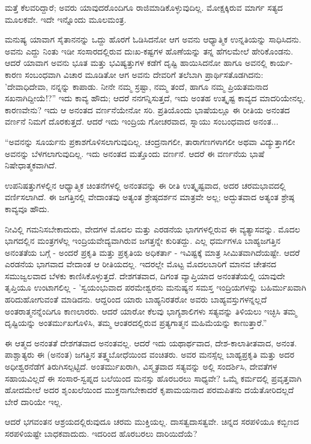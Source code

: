 ಮತ್ತೆ ಕೆಲವರಿದ್ದಾರೆ; ಅವರು ಯಾವುದರೊಂದಿಗೂ ರಾಜಿಮಾಡಿಕೊಳ್ಳುವುದಿಲ್ಲ. ಮೋಕ್ಷಕ್ಕಿರುವ ಮಾರ್ಗ ಸತ್ಯದ ಮೂಲಕವೇ. ಇದೇ ಇನ್ನೊಂದು ಮೂಲಮಂತ್ರ.

ಮನುಷ್ಯ ಯಾವಾಗ ಸೈತಾನನನ್ನು ಒದ್ದು ಹೊರಗೆ ಓಡಿಸಿದನೋ ಆಗ ಅವನು ಆಧ್ಯಾತ್ಮಿಕ ಉನ್ನತಿಯನ್ನು ಸಾಧಿಸಿದನು. ಅವನು ಎದ್ದು ನಿಂತು ಇಡೀ ಸಂಸಾರದಲ್ಲಿರುವ ದುಃಖ-ಕಷ್ಟಗಳ ಹೊಣೆಯನ್ನು ತನ್ನ ಹೆಗಲಮೇಲೆ ಹೇರಿಕೊಂಡನು. ಆದರೆ ಯಾವಾಗ ಅವನು ಭೂತ ಮತ್ತು ಭವಿಷ್ಯತ್ತುಗಳ ಕಡೆಗೆ ದೃಷ್ಟಿ ಹಾಯಿಸಿದನೋ ಹಾಗೂ ಅವನಲ್ಲಿ ಕಾರ್ಯ-ಕಾರಣ ಸಂಬಂಧವಾಗಿ ವಿಚಾರ ಮೂಡಿತೋ ಆಗ ಅವನು ದೇವರಿಗೆ ತಲೆಬಾಗಿ ಪ್ರಾರ್ಥಿಸತೊಡಗಿದನು: 'ದೇವಾಧಿದೇವಾ, ನನ್ನನ್ನು ಕಾಪಾಡು. ನೀನೇ ನಮ್ಮ ಸ್ರಷ್ಟಾ, ನಮ್ಮ ತಂದೆ, ಹಾಗೂ ನಮ್ಮ ಪ್ರಿಯತಮನಾದ ಸಖನಾಗಿದ್ದೀಯೆ!?” ಇದು ಕಾವ್ಯ ಹೌದು; ಆದರೆ ನನಗನ್ನಿಸುತ್ತದೆ, ಇದು ಅಂತಹ ಉತ್ಕೃಷ್ಟ ಕಾವ್ಯದ ಮಾದರಿಯೇನಲ್ಲ. ಕಾರಣವೇನು? ಇದು ಆ ಅನಂತದ ವರ್ಣನೆಯೇನೋ ಸರಿ. ಪ್ರತಿಯೊಂದು ಭಾಷೆಯಲ್ಲೂ ಈ ರೀತಿಯ ಅನಂತದ ವರ್ಣನೆ ನಿಮಗೆ ದೊರಕುತ್ತದೆ. ಆದರೆ ಇದು ಇಂದ್ರಿಯ ಗೋಚರವಾದ, ಸ್ನಾಯು ಸಂಬಂಧವಾದ ಅನಂತ...

“ಅವನನ್ನು ಸೂರ್ಯನು ಪ್ರಕಾಶಗೊಳಿಸಲಾಗುವುದಿಲ್ಲ. ಚಂದ್ರನಾಗಲೀ, ತಾರಾಗಣಗಳಾಗಲೀ ಅಥವಾ ವಿದ್ಯುತ್ತಾಗಲೀ ಅವನನ್ನು ಬೆಳಗಲಾಗುವುದಿಲ್ಲ. ಇದು ಅನಂತದ ಮತ್ತೊಂದು ವರ್ಣನೆ. ಆದರೆ ಈ ವರ್ಣನೆಯ ಭಾಷೆ ನಿಷೇಧಾತ್ಮಕವಾಗಿದೆ.

ಉಪನಿಷತ್ತುಗಳಲ್ಲಿನ ಆಧ್ಯಾತ್ಮಿಕ ಚಿಂತನೆಗಳಲ್ಲಿ ಅನಂತವನ್ನು ಈ ರೀತಿ ಉತ್ಕೃಷ್ಟವಾದ, ಅದರ ಚರಮಭಾವದಲ್ಲಿ ವರ್ಣಿಸಲಾಗಿದೆ. ಈ ಜಗತ್ತಿನಲ್ಲಿ ವೇದಾಂತವು ಅತ್ಯಂತ ಶ್ರೇಷ್ಠದರ್ಶನ ಮಾತ್ರವೇ ಅಲ್ಲ; ಅದ್ಭುತವಾದ ಅತ್ಯಂತ ಶ್ರೇಷ್ಠ ಕಾವ್ಯವೂ ಹೌದು.

ನೀವಿಲ್ಲಿ ಗಮನಿಸಬೇಕಾದುದು, ವೇದಗಳ ಮೊದಲ ಮತ್ತು ಎರಡನೆಯ ಭಾಗಗಳಲ್ಲಿರುವ ಈ ವ್ಯತ್ಯಾಸವನ್ನು. ಮೊದಲ ಭಾಗದಲ್ಲಿನ ಮಂತ್ರಗಳೆಲ್ಲ ಇಂದ್ರಿಯವೇದ್ಯವಾಗಿರುವ ಜಗತ್ತನ್ನೇ ಕುರಿತದ್ದು. ಎಲ್ಲ ಧರ್ಮಗಳೂ ಬಾಹ್ಯಜಗತ್ತಿನ ಅನಂತತೆಯ ಬಗ್ಗೆ - ಅಂದರೆ ಪ್ರಕೃತಿ ಮತ್ತು ಪ್ರಕೃತಿಯ ಅಧಿಕರ್ತಾ - ಇವಿಷ್ಟಕ್ಕೆ ಮಾತ್ರ ಸೀಮಿತವಾಗಿದೆಯಷ್ಟೇ. ಆದರೆ ಎರಡನೆಯ ಭಾಗವಾದ ವೇದಾಂತ ಆ ರೀತಿಯದಲ್ಲ. ಇದರಲ್ಲೇ ಮೊಟ್ಟ ಮೊದಲಬಾರಿಗೆ ಮಾನವ ಚೇತನದ ಸಮುಜ್ವಲವಾದ ಬೆಳಕು ಕಾಣಿಸಿಕೊಳ್ಳುತ್ತದೆ. ದೇಶಗತವಾದ, ದಿಗಂತ ವ್ಯಾಪ್ತಿಯಾದ ಅನಂತತೆಯಲ್ಲಿ ಯಾವುದೇ ತೃಪ್ತಿಯೂ ಉಂಟಾಗಲಿಲ್ಲ - 'ಸ್ವಯಂಭುವಾದ ಪರಮೇಶ್ವರನು ಮನುಷ್ಯನ ಸಮಸ್ತ ಇಂದ್ರಿಯಗಳನ್ನು ಬಹಿರ್ಮುಖವಾಗಿ ಹರಿದುಹೋಗುವಂತೆ ಮಾಡಿದನು. ಆದ್ದರಿಂದ ಯಾರು ಬಾಹ್ಯನಿರತರೋ ಅವರು ಬಾಹ್ಯವಸ್ತುಗಳನ್ನಲ್ಲದೆ ಅಂತರಾತ್ಮನನ್ನೆಂದಿಗೂ ಕಾಣಲಾರರು. ಆದರೆ ಯಾರೋ ಕೆಲವು ಭಾಗ್ಯಶಾಲಿಗಳು ಸತ್ಯವನ್ನು ತಿಳಿಯಲು ಇಚ್ಛಿಸಿ ತಮ್ಮ ದೃಷ್ಟಿಯನ್ನು ಅಂತರ್ಮುಖಗೊಳಿಸಿ, ತಮ್ಮ ಆಂತರದಲ್ಲಿರುವ ಪ್ರತ್ಯಗಾತ್ಮನ ಮಹಿಮೆಯನ್ನು ಕಾಣುತ್ತಾರೆ.”

ಈ ಆತ್ಮದ ಅನಂತತೆ ದೇಶಗತವಾದ ಅನಂತವಲ್ಲ. ಆದರೆ ಇದು ಯಥಾರ್ಥವಾದ, ದೇಶ-ಕಾಲಾತೀತವಾದ, ಅನಂತ. ಪಾಶ್ಚಾತ್ಯರು ಈ (ಅನಂತ) ಜಗತ್ತಿನ ತತ್ತ್ವಬೋಧೆಯಿಂದ ವಂಚಿತರು. ಅವರ ಮನಸ್ಸೆಲ್ಲ ಬಾಹ್ಯಪ್ರಕೃತಿ ಮತ್ತು ಅದರ ಅಧೀಶ್ವರನೆಡೆಗೆ ತಿರುಗಿಸಲ್ಪಟ್ಟಿದೆ. ಅಂತರ್ಮುಖರಾಗಿ, ವಿಸ್ಮೃತವಾದ ಸತ್ಯವನ್ನು ಅಲ್ಲಿ ಸಂದರ್ಶಿಸಿ, ದೇವತೆಗಳ ಸಹಾಯವಿಲ್ಲದೆ ಈ ಸಂಸಾರ-ಸ್ವಪ್ನದ ಬಲೆಯಿಂದ ಮನಸ್ಸು ಹೊರಬರಲು ಸಾಧ್ಯವೇ? ಒಮ್ಮೆ ಕರ್ಮದಲ್ಲಿ ಪ್ರವೃತ್ತವಾಗಿ ಹೋದಮೇಲೆ ಅದರ ಶೃಂಖಲೆಯಿಂದ ಮುಕ್ತನಾಗಬೇಕಾದರೆ ಕೃಪಾಮಯನಾದ ಪರಮಪಿತನು ದಯೆತೋರಿದಲ್ಲದೆ ಬೇರೆ ದಾರಿಯೇ ಇಲ್ಲ.

ಆದರೆ ಭಗವಂತನ ಆಶ್ರಯದಲ್ಲಿರುವುದೂ ಚರಮ ಮುಕ್ತಿಯಲ್ಲ. ದಾಸತ್ವ\break ದಾಸತ್ವವೇ. ಚಿನ್ನದ ಸರಪಳಿಯೂ ಕಬ್ಬಿಣದ ಸರಪಳಿಯಷ್ಟೇ ಬಾಧಕವಾದುದು. ಇದರಿಂದ ಹೊರಬರಲು ದಾರಿಯಿದೆಯೆ?

